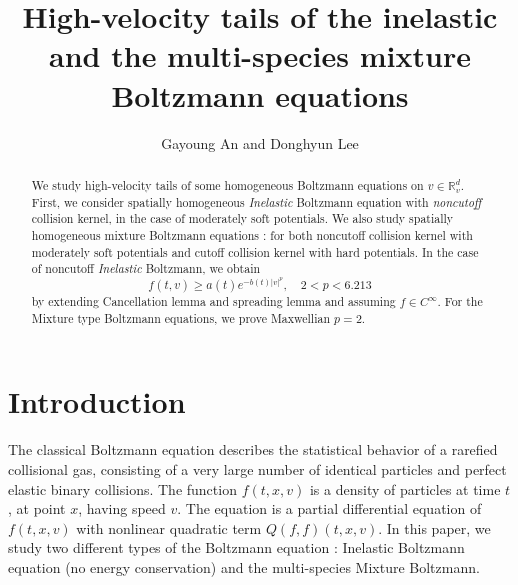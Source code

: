 \documentclass[reqno,10pt]{amsart}
\title[] {High-velocity tails of the inelastic and the multi-species mixture Boltzmann equations}
\author[] {Gayoung An and Donghyun Lee}
\numberwithin{equation}{section}
\begin{document}
\begin{abstract}
    We study high-velocity tails of some homogeneous Boltzmann equations on $v \in \mathbb{R}_{v}^d$. First, we consider spatially homogeneous {\it Inelastic} Boltzmann equation with {\it noncutoff} collision kernel, in the case of moderately soft potentials. We also study spatially homogeneous mixture Boltzmann equations : for both noncutoff collision kernel with moderately soft potentials and cutoff collision kernel with hard potentials. In the case of noncutoff {\it Inelastic} Boltzmann, we obtain 
    \[
    	f(t,v) \geq a(t) e^{-b(t)|v|^p}, \quad 2 < p < 6.213
    \]
 	by extending Cancellation lemma \cite{AD2000} and spreading lemma \cite{IM2020} and assuming $f\in C^{\infty}$. For the Mixture type Boltzmann equations, we prove Maxwellian $p=2$.
\end{abstract}

\maketitle
\tableofcontents

\section{Introduction}
The classical Boltzmann equation describes the statistical behavior of a rarefied collisional gas, consisting of a very large number of identical
particles and perfect elastic binary collisions. The function $f(t,x,v)$ is a density of particles at time $t$, at point $x$, having speed $v$. The equation is a partial differential equation of $f(t,x,v)$ with nonlinear quadratic term $Q(f,f)(t,x,v).$ In this paper, we study two different types of the Boltzmann equation : Inelastic Boltzmann equation (no energy conservation) and the multi-species Mixture Boltzmann. \\
\end{document}
